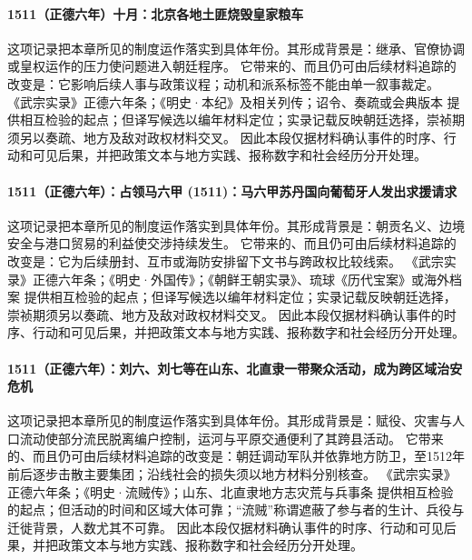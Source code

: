 \paragraph{1511（正德六年）十月：北京各地土匪烧毁皇家粮车} 这项记录把本章所见的制度运作落实到具体年份。其形成背景是：继承、官僚协调或皇权运作的压力使问题进入朝廷程序。 它带来的、而且仍可由后续材料追踪的改变是：它影响后续人事与政策议程；动机和派系标签不能由单一叙事裁定。 《武宗实录》正德六年条；《明史·本纪》及相关列传；诏令、奏疏或会典版本 提供相互检验的起点；但译写候选以编年材料定位；实录记载反映朝廷选择，崇祯期须另以奏疏、地方及敌对政权材料交叉。 因此本段仅据材料确认事件的时序、行动和可见后果，并把政策文本与地方实践、报称数字和社会经历分开处理。

\paragraph{1511（正德六年）：占领马六甲 (1511)：马六甲苏丹国向葡萄牙人发出求援请求} 这项记录把本章所见的制度运作落实到具体年份。其形成背景是：朝贡名义、边境安全与港口贸易的利益使交涉持续发生。 它带来的、而且仍可由后续材料追踪的改变是：它为后续册封、互市或海防安排留下文书与跨政权比较线索。 《武宗实录》正德六年条；《明史·外国传》；《朝鲜王朝实录》、琉球《历代宝案》或海外档案 提供相互检验的起点；但译写候选以编年材料定位；实录记载反映朝廷选择，崇祯期须另以奏疏、地方及敌对政权材料交叉。 因此本段仅据材料确认事件的时序、行动和可见后果，并把政策文本与地方实践、报称数字和社会经历分开处理。

\paragraph{1511（正德六年）：刘六、刘七等在山东、北直隶一带聚众活动，成为跨区域治安危机} 这项记录把本章所见的制度运作落实到具体年份。其形成背景是：赋役、灾害与人口流动使部分流民脱离编户控制，运河与平原交通便利了其跨县活动。 它带来的、而且仍可由后续材料追踪的改变是：朝廷调动军队并依靠地方防卫，至1512年前后逐步击散主要集团；沿线社会的损失须以地方材料分别核查。 《武宗实录》正德六年条；《明史·流贼传》；山东、北直隶地方志灾荒与兵事条 提供相互检验的起点；但活动的时间和区域大体可靠；“流贼”称谓遮蔽了参与者的生计、兵役与迁徙背景，人数尤其不可靠。 因此本段仅据材料确认事件的时序、行动和可见后果，并把政策文本与地方实践、报称数字和社会经历分开处理。

